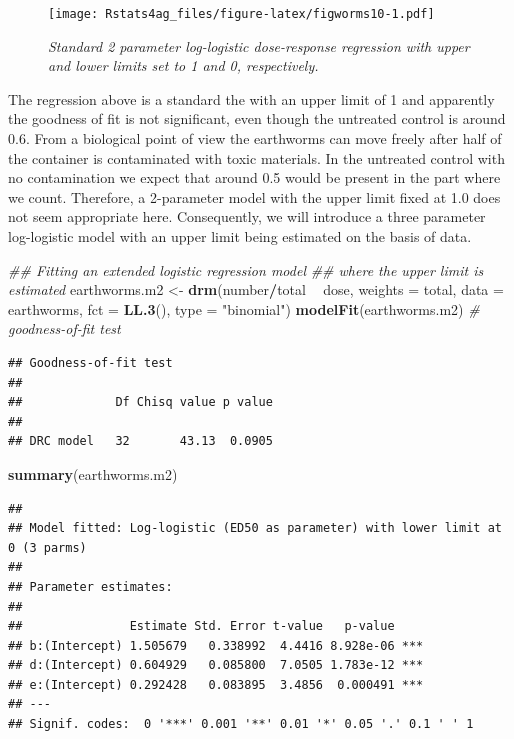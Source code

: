 \documentclass[letterpaper,]{book}
\newenvironment{Shaded}{\begin{snugshade}}{\end{snugshade}}
\newcommand{\CommentTok}[1]{\textcolor[rgb]{0.56,0.35,0.01}{\textit{#1}}}
\newcommand{\DataTypeTok}[1]{\textcolor[rgb]{0.13,0.29,0.53}{#1}}
\newcommand{\KeywordTok}[1]{\textcolor[rgb]{0.13,0.29,0.53}{\textbf{#1}}}
\newcommand{\NormalTok}[1]{#1}
\newcommand{\OperatorTok}[1]{\textcolor[rgb]{0.81,0.36,0.00}{\textbf{#1}}}
\newcommand{\StringTok}[1]{\textcolor[rgb]{0.31,0.60,0.02}{#1}}
\begin{document}
\begin{figure}
\centering
\texttt{[image: Rstats4ag\_files/figure-latex/figworms10-1.pdf]}
\caption{\label{fig:figworms10}\emph{Standard 2 parameter log-logistic dose-response regression with upper and lower limits set to 1 and 0, respectively.}}
\end{figure}

The regression above is a standard the with an upper limit of 1 and apparently the goodness of fit is not significant, even though the untreated control is around 0.6. From a biological point of view the earthworms can move freely after half of the container is contaminated with toxic materials. In the untreated control with no contamination we expect that around 0.5 would be present in the part where we count. Therefore, a 2-parameter model with the upper limit fixed at 1.0 does not seem appropriate here. Consequently, we will introduce a three parameter log-logistic model with an upper limit being estimated on the basis of data.



\begin{Shaded}
\begin{Highlighting}[]
\CommentTok{## Fitting an extended logistic regression model }
\CommentTok{##  where the upper limit is estimated}
\NormalTok{earthworms.m2 <-}\StringTok{ }\KeywordTok{drm}\NormalTok{(number}\OperatorTok{/}\NormalTok{total }\OperatorTok{~}\StringTok{ }\NormalTok{dose, }\DataTypeTok{weights =}\NormalTok{ total, }\DataTypeTok{data =}\NormalTok{ earthworms,}
                     \DataTypeTok{fct =} \KeywordTok{LL.3}\NormalTok{(), }\DataTypeTok{type =} \StringTok{"binomial"}\NormalTok{)}
\KeywordTok{modelFit}\NormalTok{(earthworms.m2)  }\CommentTok{# goodness-of-fit test}
\end{Highlighting}
\end{Shaded}

\begin{verbatim}
## Goodness-of-fit test
## 
##             Df Chisq value p value
##                                   
## DRC model   32       43.13  0.0905
\end{verbatim}

\begin{Shaded}
\begin{Highlighting}[]
\KeywordTok{summary}\NormalTok{(earthworms.m2)}
\end{Highlighting}
\end{Shaded}

\begin{verbatim}
## 
## Model fitted: Log-logistic (ED50 as parameter) with lower limit at 0 (3 parms)
## 
## Parameter estimates:
## 
##               Estimate Std. Error t-value   p-value    
## b:(Intercept) 1.505679   0.338992  4.4416 8.928e-06 ***
## d:(Intercept) 0.604929   0.085800  7.0505 1.783e-12 ***
## e:(Intercept) 0.292428   0.083895  3.4856  0.000491 ***
## ---
## Signif. codes:  0 '***' 0.001 '**' 0.01 '*' 0.05 '.' 0.1 ' ' 1
\end{verbatim}
\end{document}
